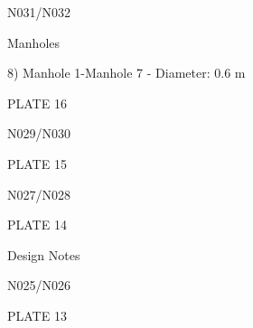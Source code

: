 \documentclass[a4paper,portrait,12pt]{article}
\begin{document}
\begin{flushleft}
N031/N032
\end{flushleft}





\begin{flushleft}
Manholes
\end{flushleft}


\begin{flushleft}
8) Manhole 1-Manhole 7 - Diameter: 0.6 m
\end{flushleft}





\begin{flushleft}
PLATE 16
\end{flushleft}





\begin{flushleft}
N029/N030
\end{flushleft}





\begin{flushleft}
PLATE 15
\end{flushleft}





\begin{flushleft}
N027/N028
\end{flushleft}





\begin{flushleft}
PLATE 14
\end{flushleft}





\begin{flushleft}
Design Notes
\end{flushleft}





\begin{flushleft}
N025/N026
\end{flushleft}





\begin{flushleft}
PLATE 13
\end{flushleft}
\end{document}

